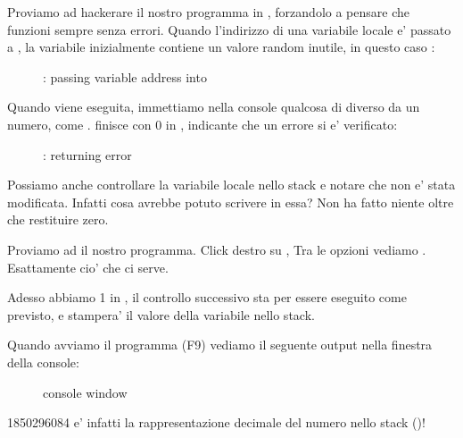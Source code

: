 \clearpage
{}

Proviamo ad hackerare il nostro programma in \olly, forzandolo a pensare che \scanf funzioni sempre senza errori.
Quando l'indirizzo di una variabile locale e' passato a \scanf, la variabile inizialmente contiene un valore random inutile, in questo caso :

\begin{figure}[H]
\centering
{}
\caption{\olly: passing variable address into \scanf}
\label{fig:scanf_ex3_olly_1}
\end{figure}

\clearpage
Quando \scanf viene eseguita, immettiamo nella console qualcosa di diverso da un numero, come .
\scanf finisce con 0 in \EAX, indicante che un errore si e' verificato:

\begin{figure}[H]
\centering
{}
\caption{\olly: \scanf returning error}
\label{fig:scanf_ex3_olly_2}
\end{figure}

Possiamo anche controllare la variabile locale nello stack e notare che non e' stata modificata.
Infatti cosa avrebbe potuto scrivere \scanf in essa? Non ha fatto niente oltre che restituire zero. 


Proviamo ad  il nostro programma.
Click destro su \EAX, 
Tra le opzioni vediamo .
Esattamente cio' che ci serve.

Adesso abbiamo 1 in \EAX, il controllo successivo sta per essere eseguito come previsto,
e \printf stampera' il valore della variabile nello stack.

Quando avviamo il programma (F9) vediamo il seguente output nella finestra della console:

\begin{figure}[H]
\centering
{}
\caption{console window}
\end{figure}

1850296084 e' infatti la rappresentazione decimale del numero nello stack ()!
